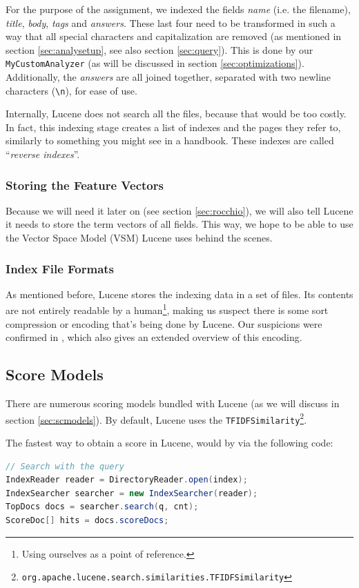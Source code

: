 \documentclass[11pt]{article}
\begin{document}
For the purpose of the assignment, we indexed the fields \textit{name} (i.e. the filename), \textit{title}, \textit{body}, \textit{tags} and \textit{answers}. These last four need to be transformed in such a way that all special characters and capitalization are removed (as mentioned in section \ref{sec:analysetup}, see also section \ref{sec:query}). This is done by our \texttt{MyCustomAnalyzer} (as will be discussed in section \ref{sec:optimizations}). Additionally, the \textit{answers} are all joined together, separated with two newline characters (\texttt{\textbackslash n}), for ease of use.

Internally, Lucene does not search all the files, because that would be too costly. In fact, this indexing stage creates a list of indexes and the pages they refer to, similarly to something you might see in a handbook. These indexes are called ``\textit{reverse indexes}''. \cite{lucene-tutorial}

\subsubsection{Storing the Feature Vectors}\label{sec:fv}
Because we will need it later on (see section \ref{sec:rocchio}), we will also tell Lucene it needs to store the term vectors of all fields. This way, we hope to be able to use the Vector Space Model (VSM) Lucene uses behind the scenes.

\subsubsection{Index File Formats}
As mentioned before, Lucene stores the indexing data in a set of files. Its contents are not entirely readable by a human\footnote{Using ourselves as a point of reference.}, making us suspect there is some sort compression or encoding that's being done by Lucene. Our suspicions were confirmed in \cite{lucene}, which also gives an extended overview of this encoding.

\subsection{Score Models}
There are numerous scoring models bundled with Lucene (as we will discuss in section \ref{sec:scmodels}). By default, Lucene uses the \texttt{TFIDFSimilarity}\footnote{\texttt{org.apache.lucene.search.similarities.TFIDFSimilarity}}.

The fastest way to obtain a score in Lucene, would by via the following code:
\begin{lstlisting}[language=Java]
// Search with the query
IndexReader reader = DirectoryReader.open(index);
IndexSearcher searcher = new IndexSearcher(reader);
TopDocs docs = searcher.search(q, cnt);
ScoreDoc[] hits = docs.scoreDocs;
\end{lstlisting}
\end{document}
